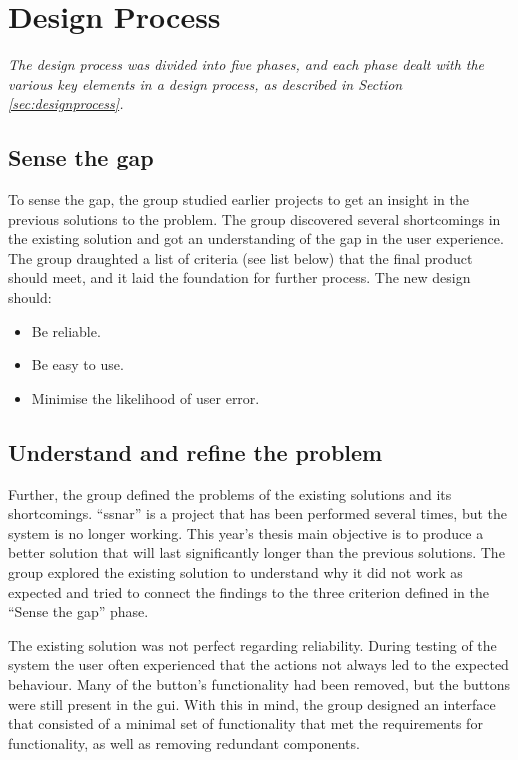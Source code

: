 \section{Design Process}
\label{secr:designproc}
\textit{The design process was divided into five phases, and each phase dealt with the various key elements in a design process, as described in Section \ref{sec:designprocess}.}

\subsection{Sense the gap}
\label{sec:sensethegap}
To sense the gap, the group studied earlier projects to get an insight in the previous solutions to the problem. The group discovered several shortcomings in the existing solution and got an understanding of the gap in the user experience. The group draughted a list of criteria (see list below) that the final product should meet, and it laid the foundation for further process. The new design should:

\begin{itemize}
    \item Be reliable.
    \item Be easy to use.
    \item Minimise the likelihood of user error.
\end{itemize}

\subsection{Understand and refine the problem}
\label{sec:understprob}
Further, the group defined the problems of the existing solutions and its shortcomings. ``\acrlong{ssnar}'' is a project that has been performed several times, but the system is no longer working. This year's thesis main objective is to produce a better solution that will last significantly longer than the previous solutions. The group explored the existing solution to understand why it did not work as expected and tried to connect the findings to the three criterion defined in the ``Sense the gap'' phase.

The existing solution was not perfect regarding reliability. During testing of the system the user often experienced that the actions not always led to the expected behaviour. Many of the button's functionality had been removed, but the buttons were still present in the \acrshort{gui}. With this in mind, the group designed an interface that consisted of a minimal set of functionality that met the requirements for functionality, as well as removing redundant components.

